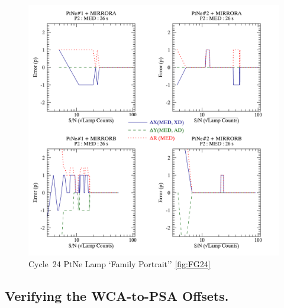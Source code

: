 \begin{figure}[htb]
\noindent\includegraphics*[width=0.795\linewidth]{png/C24_14857_Error_vs_lampSN.png}
\caption{Cycle~24 PtNe Lamp `Family Portrait'' \ref{fig:FG24}}
\end{figure}
\clearpage
\subsection{Verifying the  WCA-to-PSA Offsets.} \label{subsec:acqpeakxd}

